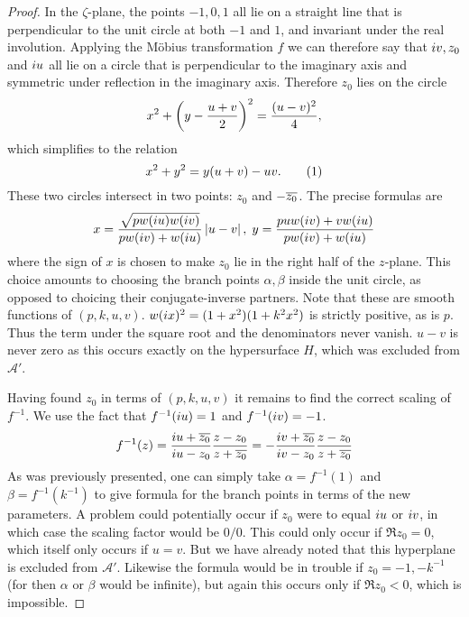 \begin{lem}
\begin{proof}
In the $ζ$-plane, the points $-1,0,1$ all lie on a straight line that is perpendicular to the unit circle at both $-1$ and $1$, and invariant under the real involution. Applying the M\"obius transformation $f$ we can therefore say that $i v, z_0$ and $i u$ all lie on a circle that is perpendicular to the imaginary axis and symmetric under reflection in the imaginary axis. Therefore $z_0$ lies on the circle
\[
x^2 + \left( y - \frac{u+v}{2} \right)^2 = \frac{(u-v)^2}{4},
\]
which simplifies to the relation
\[
x^2 + y^2 = y(u+v) - uv. \labelthis{eqn:z_0_circle}
\]
These two circles intersect in two points: $z_0$ and $-\overline{z_0}$. The precise formulas are
\[
x = \frac{\sqrt{pw(i u)w(i v)}}{pw(i v) + w(i u)} \left|u-v\right|,\; y = \frac{puw(i v) + vw(i u)}{pw(i v) + w(i u)}
\]
where the sign of $x$ is chosen to make $z_0$ lie in the right half of the $z$-plane. This choice amounts to choosing the branch points $α,β$ inside the unit circle, as opposed to choicing their conjugate-inverse partners. Note that these are smooth functions of $(p,k,u,v)$. $w(i x)^2 = (1+x^2)(1+k^2x^2)$ is strictly positive, as is $p$. Thus the term under the square root and the denominators never vanish. $u-v$ is never zero as this occurs exactly on the hypersurface $H$, which was excluded from $\mathcal{A}'$.

Having found $z_0$ in terms of $(p,k,u,v)$ it remains to find the correct scaling of $f^{-1}$. We use the fact that $f^{-1}(i u) = 1$ and $f^{-1}(i v) = -1$.
\[
f^{-1}(z)
=  \frac{i u + \overline{z_0}}{i u - z_0} \frac{z-z_0}{z + \overline{z_0}}
=  -\frac{i v + \overline{z_0}}{i v - z_0} \frac{z-z_0}{z + \overline{z_0}}
\]
As was previously presented, one can simply take $α = f^{-1}(1)$ and $β = f^{-1}(k^{-1})$ to give formula for the branch points in terms of the new parameters. A problem could potentially occur if $z_0$ were to equal $i u$ or $i v$, in which case the scaling factor would be $0/0$. This could only occur if $\Re{z_0}=0$, which itself only occurs if $u=v$. But we have already noted that this hyperplane is excluded from $\mathcal{A}'$. Likewise the formula would be in trouble if $z_0 = -1, -k^{-1}$ (for then $α$ or $β$ would be infinite), but again this occurs only if $\Re{z_0} < 0$, which is impossible.


\end{proof}
\end{lem}
